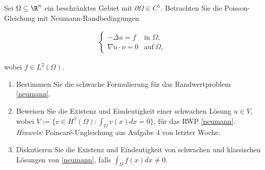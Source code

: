 
\begin{exercise}

Sei $\Omega \subseteq \R^n$ ein beschränktes Gebiet mit $\partial\Omega \in C^1$.
Betrachten Sie die Poisson-Gleichung mit Neumann-Randbedingungen

\begin{align}
    \begin{cases}
    -\Delta u = f & \text{in } \Omega, \\
    \nabla u \cdot \nu = 0 & \text{auf}~ \Omega, 
    \end{cases}
    \label{neumann}
\end{align}

wobei $f \in L^2(\Omega)$.

\begin{enumerate}[label = \alph*)]

    \item Bestimmen Sie die schwache Formulierung für das Randwertproblem \eqref{neumann}.

    \item Beweisen Sie die Existenz und Eindeutigkeit einer schwachen Lösung $u \in V$, wobei $V := \{v \in H^1(\Omega): \int_\Omega v(x)dx = 0\}$, für das RWP \eqref{neumann}.
    \textit{Hinweis:}
    Poincaré-Ungleichung aus Aufgabe 4 von letzter Woche.

    \item Diskutieren Sie die Existenz und Eindeutigkeit von schwachen und klassischen Lösungen von \eqref{neumann}, falls $\int_\Omega f(x)dx \neq 0$.

\end{enumerate}

\end{exercise}


